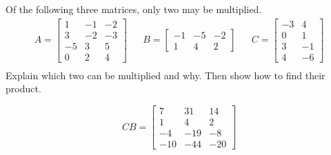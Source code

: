 
\begin{exerciseStatement}


Of the following three matrices, only two may be multiplied. 
\begin{align*} A= \left[\begin{array}{ccc}
1 & -1 & -2 \\
3 & -2 & -3 \\
-5 & 3 & 5 \\
0 & 2 & 4
\end{array}\right]  & & B= \left[\begin{array}{ccc}
-1 & -5 & -2 \\
1 & 4 & 2
\end{array}\right]  & & C= \left[\begin{array}{cc}
-3 & 4 \\
0 & 1 \\
3 & -1 \\
4 & -6
\end{array}\right]  \\ \end{align*}
             Explain which two can be multiplied and why. Then show how to find their product.


\end{exerciseStatement}
    
\begin{exerciseAnswer} 
\[CB= \left[\begin{array}{ccc}
7 & 31 & 14 \\
1 & 4 & 2 \\
-4 & -19 & -8 \\
-10 & -44 & -20
\end{array}\right] \]
\end{exerciseAnswer}
    
